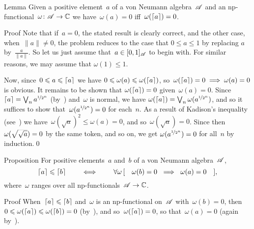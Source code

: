 \documentclass[a]{subfiles}
\begin{document}
\begin{parsec}%
\begin{point}{Lemma}%
Given a positive element~$a$
of a von Neumann algebra~$\mathscr{A}$ and an
np-functional~$\omega\colon \mathscr{A}\to\mathbb{C}$
we have~$\omega(a)=0$ iff~$\omega(\left\lceil a\right\rceil)=0$.
\begin{point}{Proof}%
Note that if~$a=0$,
the stated result is clearly correct,
and the other case, when~$\|a\| \neq 0$,
the problem reduces to the case
that $0\leq a\leq 1$
by replacing $a$ by~$\frac{a}{\|a\|}$.
So let us just assume that~$a\in [0,1]_{\mathscr{A}}$
to begin with.
For similar reasons, we may assume that $\omega (1)\leq 1$.

Now, since~$0\leqslant a\leqslant \left\lceil a\right\rceil$
we have $0\leqslant \omega(a)\leqslant \omega(\left\lceil a\right\rceil)$,
so~$\omega(\left\lceil a\right\rceil)=0\implies \omega(a)=0$
is obvious.
It remains to be shown that $\omega(\left\lceil a\right\rceil)=0$
given~$\omega(a)=0$.
Since  $\left\lceil a\right\rceil=\bigvee_n a^{\nicefrac{1}{2^n}}$ 
(by~)
and~$\omega$ is normal,
we have $\omega(\left\lceil a\right\rceil)=\bigvee_n \omega(a^{\nicefrac{1}{2^n}})$,
and so it suffices to show that~$\omega(a^{\nicefrac{1}{2^n}})=0$
for each~$n$.
As a result of Kadison's inequality
(see~)
we have~$\omega(\sqrt{a})^2\leq \omega(a)=0$,
and so~$\omega(\sqrt{a})=0$.
Since then~$\omega(\smash{\sqrt{\sqrt{a}}})=0$
by the same token, and so on,
we get $\omega(a^{\nicefrac{1}{2^n}})=0$
for all~$n$ by induction.\qed
\end{point}
\end{point}
\begin{point}{Proposition}%
For positive elements~$a$ and~$b$ of a von Neumann algebra~$\mathscr{A}$,
\begin{equation*}
\left\lceil a\right\rceil\leqslant \left\lceil b\right\rceil
\qquad\iff\qquad
\forall \omega\,[\quad\omega(b)=0\  \implies  \ \omega(a)=0\quad ],
\end{equation*}
where~$\omega$ ranges over all np-functionals~$\mathscr{A}\to\mathbb{C}$.
\begin{point}{Proof}%
When~$\left\lceil a\right\rceil\leqslant\left\lceil b\right\rceil$
and~$\omega$ is an np-functional on~$\mathscr{A}$
with~$\omega(b)=0$,
then~$0\leqslant \omega(\left\lceil a\right\rceil)\leqslant \omega(\left\lceil b\right\rceil)=0$
(by~),
and so~$\omega(\left\lceil a\right\rceil)=0$,
so that~$\omega(a)=0$
(again
by~).


\end{point}
\end{point}
\end{parsec}
\end{document}
